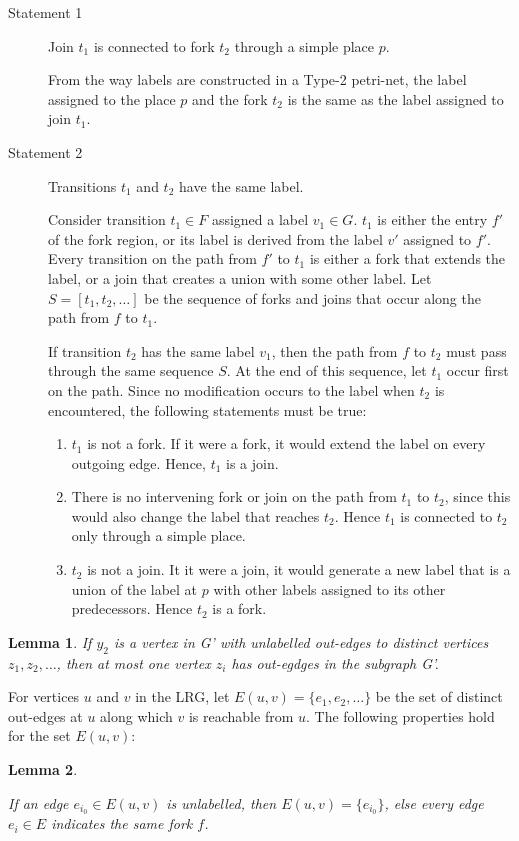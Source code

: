 \documentclass[12pt,a4paper]{article}
\newtheorem{lemma}{Lemma}
\begin{document}
\begin{description}
\item [Statement 1] Join $t_1$ is connected to fork $t_2$ through a
   simple place $p$.

   From the way labels are constructed in a Type-2 petri-net, the
   label assigned to the place $p$ and the fork $t_2$ is the same as
   the label assigned to join $t_1$.
\item [Statement 2] Transitions $t_1$ and $t_2$ have the same label.

   Consider transition $t_1\in F$ assigned a label $v_1\in G$. $t_1$
   is either the entry $f'$ of the fork region, or its label is
   derived from the label $v'$ assigned to $f'$. Every transition on
   the path from $f'$ to $t_1$ is either a fork that extends the
   label, or a join that creates a union with some other label. Let
   $S=[t_1,t_2,\ldots]$ be the sequence of forks and joins that occur
   along the path from $f$ to $t_1$.

   If transition $t_2$ has the same label $v_1$, then the path from
   $f$ to $t_2$ must pass through the same sequence $S$. At the end of
   this sequence, let $t_1$ occur first on the path. Since no
   modification occurs to the label when $t_2$ is encountered, the
   following statements must be true:

\begin{enumerate}
\item $t_1$ is not a fork. If it were a fork, it would extend the
      label on every outgoing edge. Hence, $t_1$ is a join.
\item There is no intervening fork or join on the path from $t_1$ to
      $t_2$, since this would also change the label that reaches
      $t_2$. Hence $t_1$ is connected to $t_2$ only through a simple
      place.
\item $t_2$ is not a join. It it were a join, it would generate a new
      label that is a union of the label at $p$ with other labels
      assigned to its other predecessors. Hence $t_2$ is a fork.
\end{enumerate}

\end{description}
\begin{lemma}

If $y_2$ is a vertex in G' with
unlabelled out-edges to distinct vertices $z_1,z_2,\ldots$, then at
most one vertex $z_i$ has out-egdges in the subgraph G'.

\end{lemma}

For vertices $u$ and $v$ in the LRG, let
\mbox{$E(u,v)=\{e_1,e_2,\ldots\}$} be the set of distinct out-edges at
$u$ along which $v$ is reachable from $u$. The following properties
hold for the set $E(u,v)$:

\begin{lemma}
\label{all-or-none}

If an edge $e_{i_0} \in E(u,v)$ is unlabelled, then $E(u,v) =
\{e_{i_0}\}$, else every edge $e_i \in E$ indicates the same fork $f$.

\end{lemma}
\end{document}
